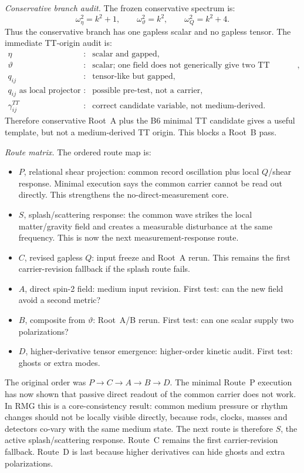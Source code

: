 \documentclass[11pt]{article}
\begin{document}
\medskip\noindent\textit{Conservative branch audit.}
The frozen conservative spectrum is:
\[
\boxed{
\omega_\eta^2=k^2+1,\qquad
\omega_\vartheta^2=k^2,\qquad
\omega_Q^2=k^2+4.
}
\]
Thus the conservative branch has one gapless scalar and no gapless tensor.
The immediate TT-origin audit is:
\[
\boxed{
\begin{array}{lll}
\eta &:& \text{scalar and gapped},\\
\vartheta &:& \text{scalar; one field does not generically give two TT polarizations},\\
q_{ij} &:& \text{tensor-like but gapped},\\
q_{ij}\text{ as local projector} &:& \text{possible pre-test, not a carrier},\\
\gamma^{TT}_{ij} &:& \text{correct candidate variable, not medium-derived}.
\end{array}}
\]
Therefore conservative Root~A plus the B6 minimal TT candidate gives a useful
template, but not a medium-derived TT origin.  This blocks a Root~B pass.

\medskip\noindent\textit{Route matrix.}
The ordered route map is:
\begin{itemize}
\item \(P\), relational shear projection: common record oscillation plus local
  \(Q\)/shear response.  Minimal execution says the common carrier cannot be
  read out directly.  This strengthens the no-direct-measurement core.
\item \(S\), splash/scattering response: the common wave strikes the local
  matter/gravity field and creates a measurable disturbance at the same
  frequency.  This is now the next measurement-response route.
\item \(C\), revised gapless \(Q\): input freeze and Root~A rerun.  This
  remains the first carrier-revision fallback if the splash route fails.
\item \(A\), direct spin-2 field: medium input revision.  First test: can the
  new field avoid a second metric?
\item \(B\), composite from \(\vartheta\): Root~A/B rerun.  First test: can
  one scalar supply two polarizations?
\item \(D\), higher-derivative tensor emergence: higher-order kinetic audit.
  First test: ghosts or extra modes.
\end{itemize}
The original order was \(P\to C\to A\to B\to D\).  The minimal Route~P
execution has now shown that passive direct readout of the common carrier does
not work.  In RMG this is a core-consistency result: common medium pressure or
rhythm changes should not be locally visible directly, because rods, clocks,
masses and detectors co-vary with the same medium state.  The next route is
therefore \(S\), the active splash/scattering response.  Route~C remains the
first carrier-revision fallback.  Route~D is last because higher derivatives
can hide ghosts and extra polarizations.
\end{document}
